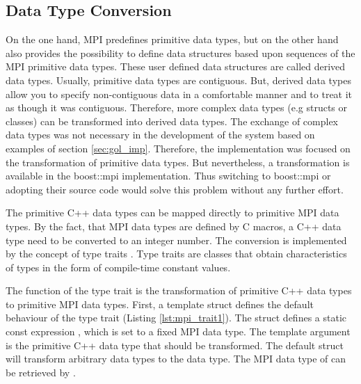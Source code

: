 \subsection{Data Type Conversion}
\label{sec:data_type_conversion}
On the one hand, MPI predefines primitive data types, but on the other hand also provides 
 the possibility to define data structures based
upon sequences of the MPI primitive data types. These user defined data
structures are called derived data types. Usually, primitive data
types are contiguous. But, derived data types allow you to specify
non-contiguous data in a comfortable manner and to treat it as though
it was contiguous.  Therefore, more complex data types (e.g structs or
classes) can be transformed into derived data types. The exchange
of complex data types was not necessary in the development of the
system based on examples of section \ref{sec:gol_imp}. Therefore, the
implementation was focused on the transformation of primitive data
types.  But nevertheless, a transformation is available in the
boost::mpi \cite{ref:boost_mpi} implementation. Thus switching to
boost::mpi or adopting their source code would solve this problem
without any further effort.

The primitive C++ data types can be mapped directly to primitive MPI
data types. By the fact, that MPI data types are defined by C macros,
a C++ data type need to be converted to an integer number. The
conversion is implemented by the concept of type traits
\cite{ref:type_trait}.  Type traits are classes that obtain
characteristics of types in the form of compile-time constant values.

The function of the type trait is the transformation of primitive C++
data types to primitive MPI data types.  First, a template struct
defines the default behaviour of the type trait (Listing
\ref{lst:mpi_trait1}). The struct defines a static const expression
, which is set to a fixed MPI data type. The template
argument  is the primitive C++ data type that should be
transformed. The default struct will transform arbitrary data types
 to the  data type. The MPI data type of
 can be retrieved by .


